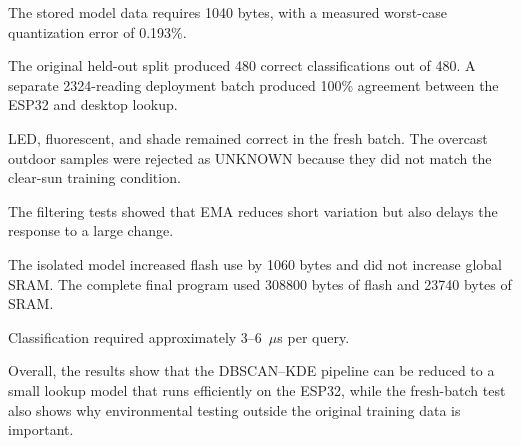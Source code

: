 \documentclass[10pt,a4paper,twocolumn]{article}
\begin{document}
The stored model data requires 1040 bytes, with a measured worst-case
quantization error of 0.193\%.

The original held-out split produced 480 correct classifications out of 480.
A separate 2324-reading deployment batch produced 100\% agreement between the
ESP32 and desktop lookup.

LED, fluorescent, and shade remained correct in the fresh batch. The overcast
outdoor samples were rejected as UNKNOWN because they did not match the
clear-sun training condition.

The filtering tests showed that EMA reduces short variation but also delays
the response to a large change.

The isolated model increased flash use by 1060 bytes and did not increase
global SRAM. The complete final program used 308800 bytes of flash and
23740 bytes of SRAM.

Classification required approximately 3--6~$\mu$s per query.

Overall, the results show that the DBSCAN--KDE pipeline can be reduced to a
small lookup model that runs efficiently on the ESP32, while the fresh-batch
test also shows why environmental testing outside the original training data
is important.
\end{document}
